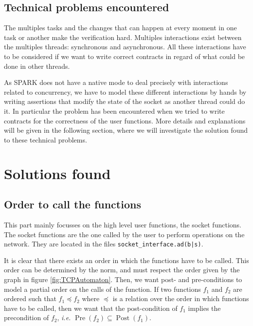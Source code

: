 \documentclass[a4paper, 10pt]{article}
\DeclareMathOperator{\Pre}{Pre}
\DeclareMathOperator{\Post}{Post}
\begin{document}
    \subsection{Technical problems encountered}

    The multiples tasks and the changes that can happen at every moment in one
    task or another make the verification hard. Multiples interactions exist
    between the multiples threads: synchronous and asynchronous.
    All these interactions have to be considered if we want to write correct contracts
    in regard of what could be done in other threads.

    As SPARK does not have a native mode to deal precisely with interactions related to concurrency, we have to
    model these different interactions by hands by writing assertions that
    modify the state of the socket as another thread could do it. In particular
    the problem has been encountered when we tried to write contracts for the correctness
    of the user functions. More details and explanations will be given in the following
    section, where we will investigate the solution found to these technical problems.

    \section{Solutions found}

    \subsection{Order to call the functions}

    This part mainly focusses on the high level user functions, the socket functions.
    The socket functions are the one called by the user to perform operations on
    the network. They are located in the files \texttt{socket\_interface.ad(b|s)}.

    It is clear that there exists an order in which the functions have to be called.
    This order can be determined by the norm, and must respect the order given by the
    graph in figure \ref{fig:TCPAutomaton}.
    Then, we want post- and pre-conditions to model a partial order on the calls of the function.
    If two functions $f_1$ and $f_2$ are ordered such that $f_1 \preceq f_2$ where $\preceq$ is
    a relation over the order in which functions have to be called, then we want that the
    post-condition of $f_1$ implies the precondition of $f_2$, \textit{i.e.} $\Pre(f_2) \subseteq \Post(f_1)$.
    
\end{document}
